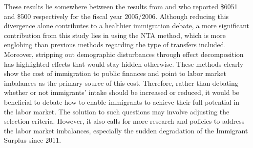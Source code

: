 \vspace{0.7em}\par
These results lie somewhere between the results from \citet{grubelFiscalTransfersImmigrants2012} and \citet{Javdani:2013gu} who reported \$\num{6051} and \$500 respectively for the fiscal year 2005/2006.
Although reducing this divergence alone contributes to a healthier immigration debate, a more significant contribution from this study lies in using the NTA method, which is more englobing than previous methods regarding the type of transfers included.
Moreover, stripping out demographic disturbances through effect decomposition has highlighted effects that would stay hidden otherwise.
These methods clearly show the cost of immigration to public finances and point to labor market imbalances as the primary source of this cost.
Therefore, rather than debating whether or not immigrants' intake should be increased or reduced, it would be beneficial to debate how to enable immigrants to achieve their full potential in the labor market.
The solution to such questions may involve adjusting the selection criteria.
However, it also calls for more research and policies to address the labor market imbalances, especially the sudden degradation of the Immigrant Surplus since 2011.